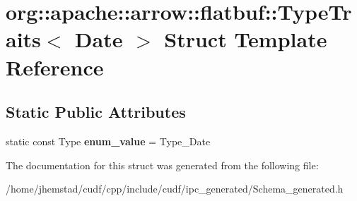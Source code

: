 \hypertarget{structorg_1_1apache_1_1arrow_1_1flatbuf_1_1TypeTraits_3_01Date_01_4}{}\section{org\+:\+:apache\+:\+:arrow\+:\+:flatbuf\+:\+:Type\+Traits$<$ Date $>$ Struct Template Reference}
\label{structorg_1_1apache_1_1arrow_1_1flatbuf_1_1TypeTraits_3_01Date_01_4}
\subsection*{Static Public Attributes}
\begin{DoxyCompactItemize}
\item 
static const Type {\bfseries enum\+\_\+value} = Type\+\_\+\+Date\hypertarget{structorg_1_1apache_1_1arrow_1_1flatbuf_1_1TypeTraits_3_01Date_01_4_a967f309b62574fc2f099253335140e07}{}\label{structorg_1_1apache_1_1arrow_1_1flatbuf_1_1TypeTraits_3_01Date_01_4_a967f309b62574fc2f099253335140e07}

\end{DoxyCompactItemize}


The documentation for this struct was generated from the following file\+:\begin{DoxyCompactItemize}
\item 
/home/jhemstad/cudf/cpp/include/cudf/ipc\+\_\+generated/Schema\+\_\+generated.\+h\end{DoxyCompactItemize}
